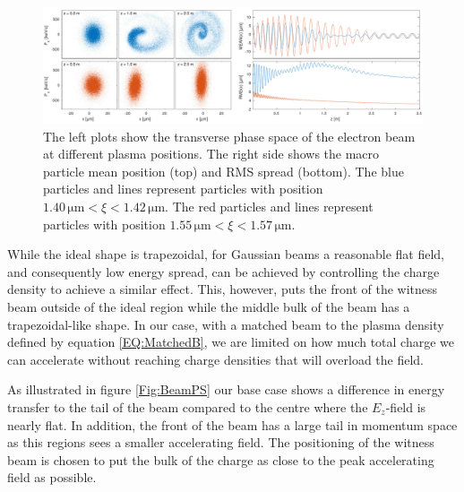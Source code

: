 \documentclass[aps,prstab,reprint,amsmath,amssymb,groupedaddress]{revtex4-1}
\newcommand{\unit}[1]{\,\mathrm{#1}}
\begin{document}
\begin{figure}[hbt]
    \includegraphics[width=\linewidth,trim={0mm 0mm 0mm 0mm},clip]{figures/beamFilamentationAll}
    \caption{\label{Fig:BeamFilament} The left plots show the transverse phase space of the electron beam at different
        plasma positions. The right side shows the macro particle mean position (top) and RMS spread (bottom). The blue
        particles and lines represent particles with position $1.40\unit{\mu m} < \xi < 1.42\unit{\mu m}$. The red
        particles and lines represent particles with position $1.55\unit{\mu m} < \xi < 1.57\unit{\mu m}$.}
\end{figure}

While the ideal shape is trapezoidal, for Gaussian beams a reasonable flat field, and consequently low energy spread,
can be achieved by controlling the charge density to achieve a similar effect. This, however, puts the front of the
witness beam outside of the ideal region while the middle bulk of the beam has a trapezoidal-like shape. In our case,
with a matched beam to the plasma density defined by equation \ref{EQ:MatchedB}, we are limited on how much total charge
we can accelerate without reaching charge densities that will overload the field.

As illustrated in figure \ref{Fig:BeamPS} our base case shows a difference in energy transfer to the tail of the beam
compared to the centre where the $E_{z}$-field is nearly flat. In addition, the front of the beam has a large tail in
momentum space as this regions sees a smaller accelerating field. The positioning of the witness beam is chosen to put
the bulk of the charge as close to the peak accelerating field as possible.
\end{document}
